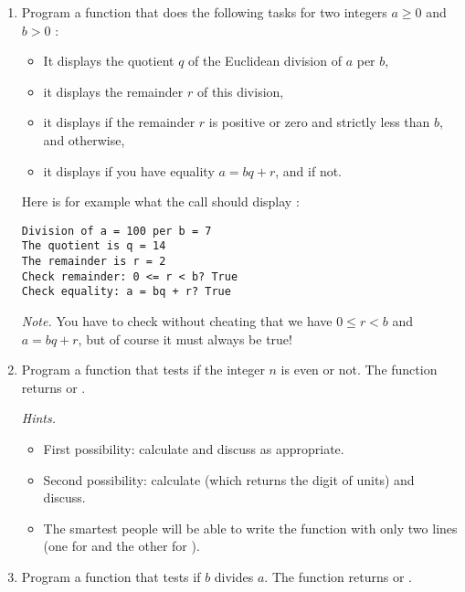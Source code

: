 \documentclass[11pt,class=report,crop=false]{standalone}
\begin{document}
\begin{activite}



\begin{enumerate}
  \item Program a function  that does the following tasks for two integers $a\ge0$ and $b>0$ :
  \begin{itemize}
    \item It displays the quotient $q$ of the Euclidean division of $a$ per $b$,
    \item it displays the remainder $r$ of this division,
    \item it displays  if the remainder $r$ is positive or zero and strictly less than $b$, and  otherwise,
    \item it displays  if you have equality $a = bq+r$, and  if not.
   \end{itemize}
    
Here is for example what the call should display :
\begin{lstlisting}  
Division of a = 100 per b = 7
The quotient is q = 14
The remainder is r = 2
Check remainder: 0 <= r < b? True
Check equality: a = bq + r? True
\end{lstlisting}

\emph{Note.} You have to check without cheating that we have $0 \le r<b$ and $a=bq+r$, but of course it must always be true!
  
  
  \item Program a function  that tests if the integer $n$ is even or not. The function returns  or .
  
  \emph{Hints.}
  \begin{itemize}
    \item First possibility: calculate  and discuss as appropriate.
    \item Second possibility: calculate  (which returns the digit of units) and discuss.
    \item The smartest people will be able to write the function with only two lines (one for  and the other for ).
   \end{itemize}
   
  \item Program a function  that tests if $b$ divides $a$. The function returns  or .
  
\end{enumerate}   
     
\end{activite}
\end{document}

